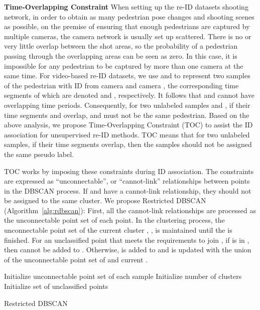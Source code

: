 \documentclass[10pt,twocolumn,letterpaper]{article}
\begin{document}
\noindent \textbf{Time-Overlapping Constraint} 
When setting up the re-ID datasets shooting network, in order to obtain as many pedestrian pose changes and shooting scenes as possible, on the premise of ensuring that enough pedestrians are captured by multiple cameras, the camera network is usually set up scattered. There is no or very little overlap between the shot areas, so the probability of a pedestrian passing through the overlapping areas can be seen as zero. In this case, it is impossible for any pedestrian to be captured by more than one camera at the same time. For video-based re-ID datasets, we use  and  to represent two samples of the pedestrian with ID  from camera  and camera , the corresponding time segments of which are denoted  and , respectively. It follows that  and  cannot have overlapping time periods. Consequently, for two unlabeled samples  and , if their time segments  and  overlap,  and  must not be the same pedestrian. Based on the above analysis, we propose Time-Overlapping Constraint (TOC) to assist the ID association for unsupervised re-ID methods. TOC means that for two unlabeled samples, if their time segments overlap, then the samples should not be assigned the same pseudo label.

TOC works by imposing these constraints during ID association. The constraints are expressed as ``unconnectable'', or ``cannot-link'' relationships between points in the DBSCAN process. If  and  have a cannot-link relationship, they should not be assigned to the same cluster. We propose Restricted DBSCAN (Algorithm~\ref{alg:rdbscan}): First, all the cannot-link relationships are processed as the unconnectable point set  of each point. In the clustering process, the unconnectable point set of the current cluster , , is maintained until the  is finished. For an unclassified point  that meets the requirements to join , if  is in , then  cannot be added to . Otherwise,  is added to  and  is updated with the union of the unconnectable point set of  and current .

\begin{algorithm}
    \SetAlgoLined
        Initialize unconnectable point set of each sample \;
        Initialize number of clusters \;
        Initialize set of unclassified points \;
        \caption{Restricted DBSCAN}
    \label{alg:rdbscan}
\end{algorithm}
\end{document}
